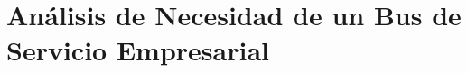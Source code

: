 \section{Análisis de Necesidad de un Bus de Servicio Empresarial}
\label{appendix:lista_de_chequeo_ESB}